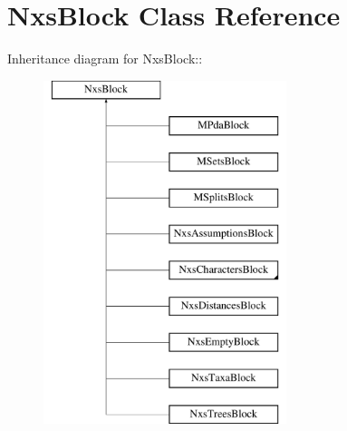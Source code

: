 \hypertarget{classNxsBlock}{
\section{NxsBlock Class Reference}
\label{classNxsBlock}
}
Inheritance diagram for NxsBlock::\begin{figure}[H]
\begin{center}
\leavevmode
\includegraphics[height=10cm]{classNxsBlock}
\end{center}
\end{figure}
